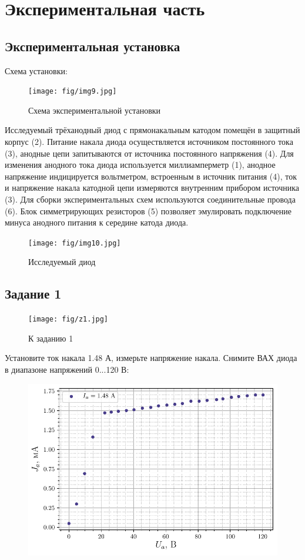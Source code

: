 \section{Экспериментальная часть}
\subsection{Экспериментальная установка}
Схема установки:
\begin{figure}[h!]
	\centering
	\texttt{[image: fig/img9.jpg]}
	\caption{Схема экспериментальной установки}
	\label{fig:10}
\end{figure}

Исследуемый трёханодный диод с прямонакальным катодом помещён в защитный корпус (2). Питание накала диода осуществляется источником постоянного тока (3), анодные цепи запитываются от источника постоянного напряжения (4). Для изменения анодного тока диода используется миллиамперметр (1), анодное напряжение индицируется вольтметром, встроенным в источник питания (4), ток и напряжение накала катодной цепи измеряются внутренним прибором источника (3). Для сборки экспериментальных схем используются соединительные провода (6). Блок симметрирующих резисторов (5) позволяет эмулировать подключение минуса анодного питания к середине катода диода.

\begin{figure}[h!]
	\centering
	\texttt{[image: fig/img10.jpg]}
	\caption{Исследуемый диод}
	\label{fig:11}
\end{figure}

\subsection{Задание 1}
\begin{figure}[h!]
	\centering
	\texttt{[image: fig/z1.jpg]}
	\caption{К заданию 1}
	\label{fig:12}
\end{figure}


Установите ток накала 1.48 А, измерьте напряжение накала. Снимите ВАХ диода в диапазоне напряжений 0...120 В:

\begin{figure}[H]
	\centering
    \includegraphics[width=0.9\linewidth]{scripts/fig1}
	\caption{}
	\label{fig:13}
\end{figure}
\newpage
